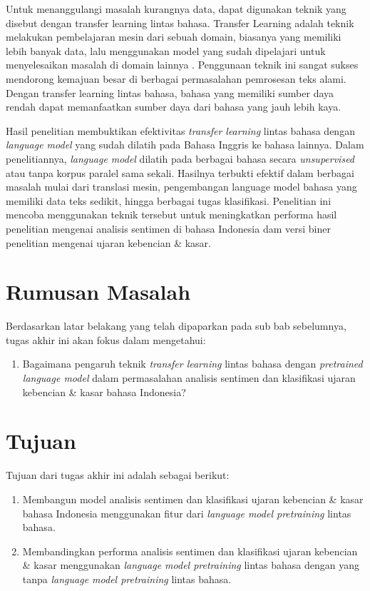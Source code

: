 Untuk menanggulangi masalah kurangnya data, dapat digunakan teknik yang disebut dengan transfer learning lintas bahasa. Transfer Learning adalah teknik melakukan pembelajaran mesin dari sebuah domain, biasanya yang memiliki lebih banyak data, lalu menggunakan model yang sudah dipelajari untuk menyelesaikan masalah di domain lainnya \parencite{ruder2019transfer}. Penggunaan teknik ini sangat sukses mendorong kemajuan besar di berbagai permasalahan pemrosesan teks alami. Dengan transfer learning lintas bahasa, bahasa yang memiliki sumber daya rendah dapat memanfaatkan sumber daya dari bahasa yang jauh lebih kaya.

Hasil penelitian \parencite{LampleConneau2019} membuktikan efektivitas \textit{transfer learning} lintas bahasa dengan \textit{language model} yang sudah dilatih pada Bahasa Inggris ke bahasa lainnya. Dalam penelitiannya, \textit{language model} dilatih pada berbagai bahasa secara \textit{unsupervised} atau tanpa korpus paralel sama sekali. Hasilnya terbukti efektif dalam berbagai masalah mulai dari translasi mesin, pengembangan language model bahasa yang memiliki data teks sedikit, hingga berbagai tugas klasifikasi. Penelitian ini mencoba menggunakan teknik tersebut untuk meningkatkan performa hasil penelitian \parencite{CrisdayantiPurwarianti2019} mengenai analisis sentimen di bahasa Indonesia dam versi biner penelitian \parencite{Ibrohim_Budi_2019} mengenai ujaran kebencian \& kasar. 

\section{Rumusan Masalah}

Berdasarkan latar belakang yang telah dipaparkan pada sub bab sebelumnya, tugas akhir ini akan fokus dalam mengetahui: 
\begin{enumerate}
	\item Bagaimana pengaruh teknik \textit{transfer learning} lintas bahasa dengan \textit{pretrained language model} dalam permasalahan analisis sentimen dan klasifikasi ujaran kebencian \& kasar bahasa Indonesia?
\end{enumerate}

\section{Tujuan}

Tujuan dari tugas akhir ini adalah sebagai berikut:
\begin{enumerate}
	\item Membangun model analisis sentimen dan klasifikasi ujaran kebencian \& kasar bahasa Indonesia menggunakan fitur dari \textit{language model pretraining} lintas bahasa.
	\item Membandingkan performa analisis sentimen dan klasifikasi ujaran kebencian \& kasar menggunakan \textit{language model pretraining} lintas bahasa dengan yang tanpa \textit{language model pretraining} lintas bahasa.
\end{enumerate}

